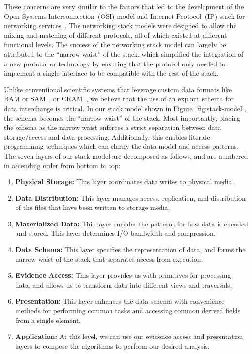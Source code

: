 \documentclass[phd]{ucbthesis}
\begin{document}
These concerns are very similar to the factors that led to the development of the Open Systems
Interconnection~(OSI) model and Internet Protocol~(IP) stack for networking
services~\cite{zimmermann80}. The networking stack models were designed to allow the mixing and
matching of different protocols, all of which existed at different functional levels. The success of the
networking stack model can largely be attributed to the ``narrow waist'' of the stack, which simplified the
integration of a new protocol or technology by ensuring that the protocol only needed to implement a
single interface to be compatible with the rest of the stack.

Unlike conventional scientific systems that leverage custom data formats like BAM or SAM~\cite{li09},
or CRAM~\cite{fritz11}, we believe that the use of an explicit schema for data interchange is critical.
In our stack model shown in Figure~\ref{fig:stack-model}, the schema becomes the ``narrow waist''
of the stack. Most importantly, placing the schema as the narrow waist enforces a strict separation
between data storage/access and data processing. Additionally, this enables literate programming
techniques which can clarify the data model and access patterns. The seven layers of our stack model
are decomposed as follows, and are numbered in ascending order from bottom to top:

\begin{enumerate}
\item \textbf{Physical Storage:} This layer coordinates data writes to physical media.
\item \textbf{Data Distribution:} This layer manages access, replication, and distribution of the files that have
been written to storage media.
\item \textbf{Materialized Data:} This layer encodes the patterns for how data is encoded and stored. This
layer determines I/O bandwidth and compression.
\item \textbf{Data Schema:} This layer specifies the representation of data, and forms the narrow waist of
the stack that separates access from execution.
\item \textbf{Evidence Access:} This layer provides us with primitives for processing data, and allows us to
transform data into different views and traversals.
\item \textbf{Presentation:} This layer enhances the data schema with convenience methods for performing
common tasks and accessing common derived fields from a single element.
\item \textbf{Application:} At this level, we can use our evidence access and presentation layers to compose
the algorithms to perform our desired analysis.
\end{enumerate}
\end{document}
